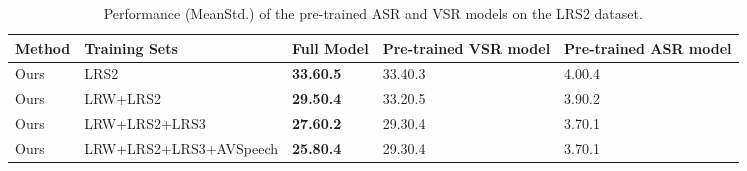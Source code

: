\documentclass[twocolumn]{article}
\begin{document}
\begin{table*}[!t]
\caption{Performance (MeanStd.) of the pre-trained ASR and VSR models on the LRS2 dataset.}
\renewcommand\arraystretch{1.0}
\begin{tabularx}{2\columnwidth}{f q y y y }
\toprule
Method &Training Sets & Full Model  &Pre-trained VSR model &Pre-trained ASR model \\
\midrule\midrule
Ours &LRS2 &\bf 33.60.5 &33.40.3 &4.00.4  \\
\midrule
Ours &LRW+LRS2  &\bf 29.50.4 &33.20.5 &3.90.2   \\
\midrule
Ours &LRW+LRS2+LRS3 &\bf 27.60.2  &29.30.4 &3.70.1   \\
\midrule
Ours &LRW+LRS2+LRS3+AVSpeech &\bf 25.80.4 &29.30.4 &3.70.1 \\
\bottomrule
\end{tabularx}
\label{table: supplemental_results_on_LRS2}
\end{table*}
\end{document}

